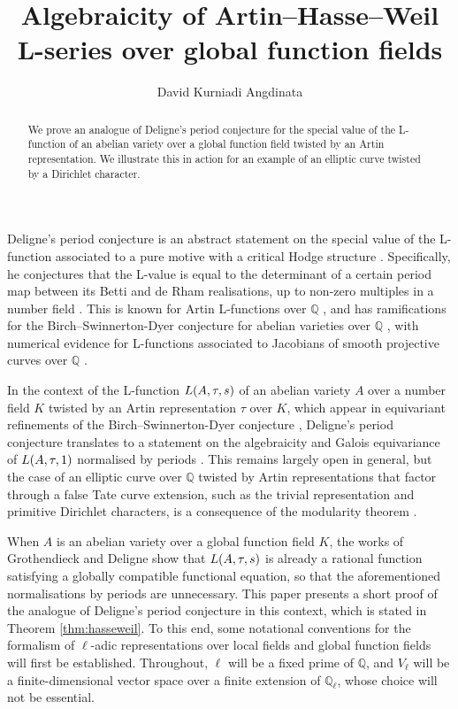 \documentclass{article}
\title{Algebraicity of Artin--Hasse--Weil L-series over global function fields}
\author{David Kurniadi Angdinata}
\theoremstyle{definition}
\theoremstyle{definition}
\newcommand{\QQ}{\mathbb{Q}}
\newcommand{\br}{\!\del[0]}
\begin{document}
\maketitle

\begin{abstract}
We prove an analogue of Deligne's period conjecture for the special value of the L-function of an abelian variety over a global function field twisted by an Artin representation. We illustrate this in action for an example of an elliptic curve twisted by a Dirichlet character.
\end{abstract}

Deligne's period conjecture is an abstract statement on the special value of the L-function associated to a pure motive with a critical Hodge structure \cite[Definition 1.3]{Del79}. Specifically, he conjectures that the L-value is equal to the determinant of a certain period map between its Betti and de Rham realisations, up to non-zero multiples in a number field \cite[Conjecture 2.8]{Del79}. This is known for Artin L-functions over $ \QQ $ \cite[Proposition 6.7]{Del79}, and has ramifications for the Birch--Swinnerton-Dyer conjecture for abelian varieties over $ \QQ $ \cite[Section 4]{Del79}, with numerical evidence for L-functions associated to Jacobians of smooth projective curves over $ \QQ $ \cite[Conjecture 1.1]{ECW24}.

In the context of the L-function $ L\br{A, \tau, s} $ of an abelian variety $ A $ over a number field $ K $ twisted by an Artin representation $ \tau $ over $ K $, which appear in equivariant refinements of the Birch--Swinnerton-Dyer conjecture \cite[Conjecture 3.3]{BC24}, Deligne's period conjecture translates to a statement on the algebraicity and Galois equivariance of $ L\br{A, \tau, 1} $ normalised by periods \cite[Proposition 4.3.8]{Eva21}. This remains largely open in general, but the case of an elliptic curve over $ \QQ $ twisted by Artin representations that factor through a false Tate curve extension, such as the trivial representation and primitive Dirichlet characters, is a consequence of the modularity theorem \cite[Theorem 4.2]{BD07}.

When $ A $ is an abelian variety over a global function field $ K $, the works of Grothendieck \cite[Theorem 5.1]{Gro95} and Deligne \cite[Theorem 9.3]{Del73} show that $ L\br{A, \tau, s} $ is already a rational function satisfying a globally compatible functional equation, so that the aforementioned normalisations by periods are unnecessary. This paper presents a short proof of the analogue of Deligne's period conjecture in this context, which is stated in Theorem \ref{thm:hasseweil}. To this end, some notational conventions for the formalism of $ \ell $-adic representations over local fields and global function fields will first be established. Throughout, $ \ell $ will be a fixed prime of $ \QQ $, and $ V_\ell $ will be a finite-dimensional vector space over a finite extension of $ \QQ_\ell $, whose choice will not be essential.
\end{document}
